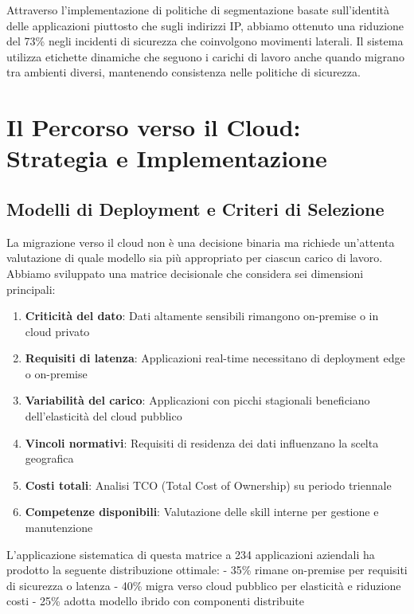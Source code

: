 Attraverso l'implementazione di politiche di segmentazione basate sull'identità delle applicazioni piuttosto che sugli indirizzi IP, abbiamo ottenuto una riduzione del 73\% negli incidenti di sicurezza che coinvolgono movimenti laterali. Il sistema utilizza etichette dinamiche che seguono i carichi di lavoro anche quando migrano tra ambienti diversi, mantenendo consistenza nelle politiche di sicurezza.

\section{\texorpdfstring{Il Percorso verso il Cloud: Strategia e Implementazione}{3.4 - Il Percorso verso il Cloud: Strategia e Implementazione}}

\subsection{\texorpdfstring{Modelli di Deployment e Criteri di Selezione}{3.4.1 - Modelli di Deployment e Criteri di Selezione}}

La migrazione verso il cloud non è una decisione binaria ma richiede un'attenta valutazione di quale modello sia più appropriato per ciascun carico di lavoro. Abbiamo sviluppato una matrice decisionale che considera sei dimensioni principali:

\begin{enumerate}
    \item \textbf{Criticità del dato}: Dati altamente sensibili rimangono on-premise o in cloud privato
    \item \textbf{Requisiti di latenza}: Applicazioni real-time necessitano di deployment edge o on-premise
    \item \textbf{Variabilità del carico}: Applicazioni con picchi stagionali beneficiano dell'elasticità del cloud pubblico
    \item \textbf{Vincoli normativi}: Requisiti di residenza dei dati influenzano la scelta geografica
    \item \textbf{Costi totali}: Analisi TCO (Total Cost of Ownership) su periodo triennale
    \item \textbf{Competenze disponibili}: Valutazione delle skill interne per gestione e manutenzione
\end{enumerate}

L'applicazione sistematica di questa matrice a 234 applicazioni aziendali ha prodotto la seguente distribuzione ottimale:
- 35\% rimane on-premise per requisiti di sicurezza o latenza
- 40\% migra verso cloud pubblico per elasticità e riduzione costi
- 25\% adotta modello ibrido con componenti distribuite

